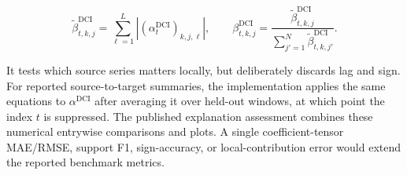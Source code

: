\begin{equation}
    \widetilde\beta^{\mathrm{DCI}}_{t,k,j}
    =\sum_{\ell=1}^{L}
      \left|(\alpha^{\mathrm{DCI}}_t)_{k,j,\ell}\right|,
    \qquad
    \beta^{\mathrm{DCI}}_{t,k,j}
    =\frac{\widetilde\beta^{\mathrm{DCI}}_{t,k,j}}
    {\sum_{j'=1}^{N}\widetilde\beta^{\mathrm{DCI}}_{t,k,j'}}.
\end{equation}

It tests which source series matters locally, but deliberately discards lag
and sign. For reported source-to-target summaries, the implementation applies
the same equations to $\alpha^{\mathrm{DCI}}$ after averaging it over held-out
windows, at which point the index $t$ is suppressed. The published explanation
assessment combines these numerical entrywise comparisons and plots. A single
coefficient-tensor MAE/RMSE, support F1, sign-accuracy, or local-contribution
error would extend the reported benchmark metrics.

